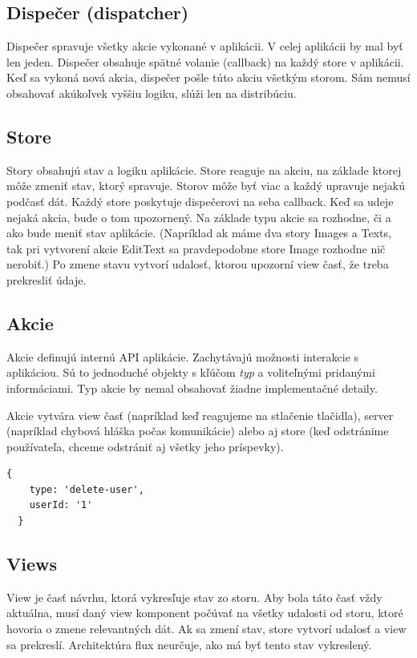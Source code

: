\subsection{Dispečer (dispatcher)}
Dispečer spravuje všetky akcie vykonané v aplikácii. V celej aplikácii by mal byť len jeden. Dispečer obsahuje spätné volanie (callback) na každý store v aplikácii. Keď sa vykoná nová akcia, dispečer pošle túto akciu všetkým storom. Sám nemusí obsahovať akúkoľvek vyššiu logiku, slúži len na distribúciu.

\subsection{Store}
Story obsahujú stav a logiku aplikácie. Store reaguje na akciu, na základe ktorej môže zmeniť stav, ktorý spravuje. Storov môže byť viac a každý upravuje nejakú podčasť dát. Každý store poskytuje dispečerovi na seba callback. Keď sa udeje nejaká akcia, bude o tom upozornený. Na základe typu akcie sa rozhodne, či a ako bude meniť stav aplikácie. (Napríklad ak máme dva story Images a Texts, tak pri vytvorení akcie EditText sa pravdepodobne store Image rozhodne nič nerobiť.) Po zmene stavu vytvorí udalosť, ktorou upozorní view časť, že treba prekresliť údaje.

\subsection{Akcie}
Akcie definujú internú API aplikácie. Zachytávajú možnosti interakcie s aplikáciou. Sú to jednoduché objekty s kľúčom \emph{typ} a voliteľnými pridanými informáciami. Typ akcie by nemal obsahovať žiadne implementačné detaily.

Akcie vytvára view časť (napríklad keď reagujeme na stlačenie tlačidla), server (napríklad chybová hláška počas komunikácie) alebo aj store (keď odstránime používateľa, chceme odstrániť aj všetky jeho príspevky).

\begin{lstlisting}[caption=Akcia vo Flux architektúre]
  {
  	type: 'delete-user',
  	userId: '1'
  }
\end{lstlisting}

\subsection{Views}
View je časť návrhu, ktorá vykresľuje stav zo storu. Aby bola táto časť vždy aktuálna, musí daný view komponent počúvať na všetky udalosti od storu, ktoré hovoria o zmene relevantných dát. Ak sa zmení stav, store vytvorí udalosť a view sa prekreslí. Architektúra flux neurčuje, ako má byť tento stav vykreslený.

